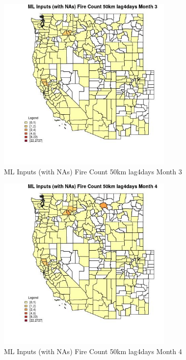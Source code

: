 \begin{figure} 
\centering  
\includegraphics[width=0.77\textwidth]{Code_Outputs/Report_ML_input_PM25_Step4_part_f_de_duplicated_aves_prioritize_24hr_obswNAs_CountyFire_Count_50km_lag4daysmedianMonth3.jpg} 
\caption{\label{fig:Report_ML_input_PM25_Step4_part_f_de_duplicated_aves_prioritize_24hr_obswNAsCountyFire_Count_50km_lag4daysmedianMonth3}ML Inputs (with NAs) Fire Count 50km lag4days Month 3} 
\end{figure} 
 

\begin{figure} 
\centering  
\includegraphics[width=0.77\textwidth]{Code_Outputs/Report_ML_input_PM25_Step4_part_f_de_duplicated_aves_prioritize_24hr_obswNAs_CountyFire_Count_50km_lag4daysmedianMonth4.jpg} 
\caption{\label{fig:Report_ML_input_PM25_Step4_part_f_de_duplicated_aves_prioritize_24hr_obswNAsCountyFire_Count_50km_lag4daysmedianMonth4}ML Inputs (with NAs) Fire Count 50km lag4days Month 4} 
\end{figure} 
 

